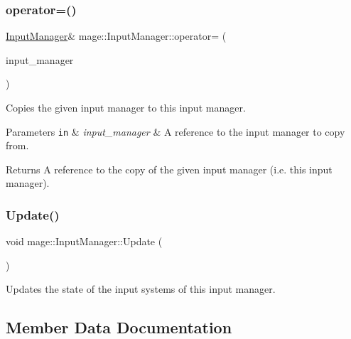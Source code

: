 \subsubsection{\texorpdfstring{operator=()}{operator=()}\hspace{0.1cm}{\footnotesize\ttfamily [2/2]}}
{\footnotesize\ttfamily \hyperlink{classmage_1_1_input_manager}{Input\+Manager}\& mage\+::\+Input\+Manager\+::operator= (\begin{DoxyParamCaption}\item[{\hyperlink{classmage_1_1_input_manager}{Input\+Manager} \&\&}]{input\+\_\+manager }\end{DoxyParamCaption})\hspace{0.3cm}{\ttfamily [delete]}}

Copies the given input manager to this input manager.


\begin{DoxyParams}[1]{Parameters}
\mbox{\tt in}  & {\em input\+\_\+manager} & A reference to the input manager to copy from. \\
\hline
\end{DoxyParams}
\begin{DoxyReturn}{Returns}
A reference to the copy of the given input manager (i.\+e. this input manager). 
\end{DoxyReturn}
\hypertarget{classmage_1_1_input_manager_a5e516969ff4ae9876b98c28f48f93726}{}\label{classmage_1_1_input_manager_a5e516969ff4ae9876b98c28f48f93726} 
\subsubsection{\texorpdfstring{Update()}{Update()}}
{\footnotesize\ttfamily void mage\+::\+Input\+Manager\+::\+Update (\begin{DoxyParamCaption}{ }\end{DoxyParamCaption})}

Updates the state of the input systems of this input manager. 

\subsection{Member Data Documentation}
\hypertarget{classmage_1_1_input_manager_a0ffbd0e68b5bab33c35f310625884f3a}{}\label{classmage_1_1_input_manager_a0ffbd0e68b5bab33c35f310625884f3a} 
